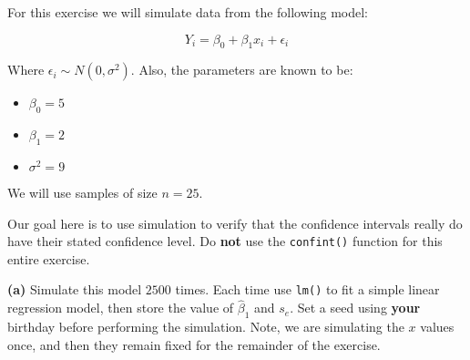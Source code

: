 \documentclass[
]{article}
\providecommand{\tightlist}{%
  \setlength{\itemsep}{0pt}\setlength{\parskip}{0pt}}
\begin{document}
For this exercise we will simulate data from the following model:

\[
Y_i = \beta_0 + \beta_1 x_i + \epsilon_i
\]

Where \(\epsilon_i \sim N(0, \sigma^2).\) Also, the parameters are known
to be:

\begin{itemize}
\tightlist
\item
  \(\beta_0 = 5\)
\item
  \(\beta_1 = 2\)
\item
  \(\sigma^2 = 9\)
\end{itemize}

We will use samples of size \(n = 25\).

Our goal here is to use simulation to verify that the confidence
intervals really do have their stated confidence level. Do \textbf{not}
use the \texttt{confint()} function for this entire exercise.

\textbf{(a)} Simulate this model \(2500\) times. Each time use
\texttt{lm()} to fit a simple linear regression model, then store the
value of \(\hat{\beta}_1\) and \(s_e\). Set a seed using \textbf{your}
birthday before performing the simulation. Note, we are simulating the
\(x\) values once, and then they remain fixed for the remainder of the
exercise.
\end{document}
